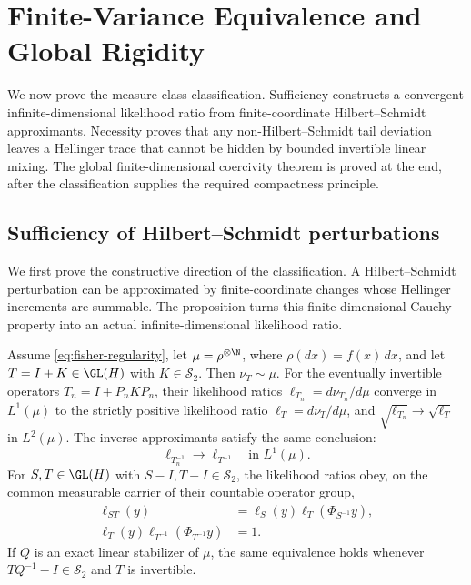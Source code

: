 \section{Finite-Variance Equivalence and Global Rigidity}
\label{sec:finite-variance-equivalence-and-global-rigidity}

We now prove the measure-class classification.
Sufficiency constructs a convergent infinite-dimensional likelihood ratio from
finite-coordinate Hilbert--Schmidt approximants.
Necessity proves that any non-Hilbert--Schmidt tail deviation leaves a
Hellinger trace that cannot be hidden by bounded invertible linear mixing.
The global finite-dimensional coercivity theorem is proved at the end,
after the classification supplies the required compactness principle.

\subsection{Sufficiency of Hilbert--Schmidt perturbations}
\label{sec:sufficiency}

We first prove the constructive direction of the classification.
A Hilbert--Schmidt perturbation can be approximated by finite-coordinate
changes whose Hellinger increments are summable.
The proposition turns this finite-dimensional Cauchy property into an actual
infinite-dimensional likelihood ratio.

\begin{proposition}
\label{prop:hilbert-schmidt-sufficiency}
Assume \eqref{eq:fisher-regularity}, let
$\mu=\rho^{\otimes\N}$, where $\rho(dx)=f(x)\,dx$, and let
$T=I+K\in\GL(H)$ with $K\in\mathcal S_2$.
Then \(\nu_T\sim\mu\).
For the eventually invertible operators
$T_n=I+P_nKP_n$, their likelihood ratios
$\ell_{T_n}=d\nu_{T_n}/d\mu$ converge in $L^1(\mu)$ to the strictly
positive likelihood ratio $\ell_T=d\nu_T/d\mu$, and
$\sqrt{\ell_{T_n}}\to\sqrt{\ell_T}$ in $L^2(\mu)$.
The inverse approximants satisfy the same conclusion:
\[
 \ell_{T_n^{-1}}\longrightarrow\ell_{T^{-1}}
 \quad\text{in }L^1(\mu).
\]
For $S,T\in\GL(H)$ with $S-I,T-I\in\mathcal S_2$, the
likelihood ratios obey, on the common measurable carrier of their countable
operator group,
\begin{align}
 \ell_{ST}(y)&=\ell_S(y)\ell_T(\Phi_{S^{-1}}y),
   \label{eq:rn-cocycle}\\
 \ell_T(y)\ell_{T^{-1}}(\Phi_{T^{-1}}y)&=1.
   \label{eq:rn-inverse}
\end{align}
If $Q$ is an exact linear stabilizer of $\mu$, the same equivalence
holds whenever \(TQ^{-1}-I\in\mathcal S_2\) and \(T\) is invertible.
\end{proposition}

